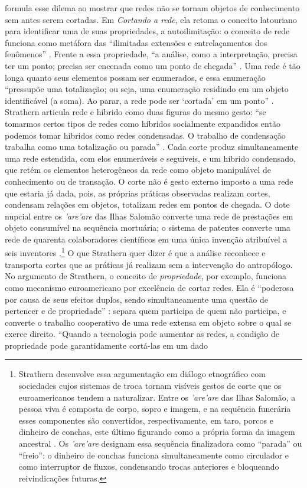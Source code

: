 \textcite{strathern2011cortando} formula esse dilema ao mostrar que redes não se tornam objetos de conhecimento sem antes serem cortadas. Em \textit{Cortando a rede}, ela retoma o conceito latouriano para identificar uma de suas propriedades, a autoilimitação: o conceito de rede funciona como metáfora das ``ilimitadas extensões e entrelaçamentos dos fenômenos'' \parencite[p.~7]{strathern2011cortando}. Frente a essa propriedade, ``a análise, como a interpretação, precisa ter um ponto; precisa ser encenada como um ponto de chegada'' \parencite[p.~7]{strathern2011cortando}. Uma rede é tão longa quanto seus elementos possam ser enumerados, e essa enumeração ``pressupõe uma totalização; ou seja, uma enumeração residindo em um objeto identificável (a soma). Ao parar, a rede pode ser `cortada' em um ponto'' \parencite[p.~7]{strathern2011cortando}. Strathern articula rede e híbrido como duas figuras do mesmo gesto: ``se tomarmos certos tipos de redes como híbridos socialmente expandidos então podemos tomar híbridos como redes condensadas. O trabalho de condensação trabalha como uma totalização ou parada'' \parencite[pp.~7--8]{strathern2011cortando}. Cada corte produz simultaneamente uma rede estendida, com elos enumeráveis e seguíveis, e um híbrido condensado, que retém os elementos heterogêneos da rede como objeto manipulável de conhecimento ou de transação. O corte não é gesto externo imposto a uma rede que estaria já dada, pois, as próprias práticas observadas realizam cortes, condensam relações em objetos, totalizam redes em pontos de chegada. O dote nupcial entre os \textit{'are'are} das Ilhas Salomão converte uma rede de prestações em objeto consumível na sequência mortuária; o sistema de patentes converte uma rede de quarenta colaboradores científicos em uma única invenção atribuível a seis inventores \parencite[pp.~8--9]{strathern2011cortando}.\footnote{Strathern desenvolve essa argumentação em diálogo etnográfico com sociedades cujos sistemas de troca tornam visíveis gestos de corte que os euroamericanos tendem a naturalizar. Entre os \textit{'are'are} das Ilhas Salomão, a pessoa viva é composta de corpo, sopro e imagem, e na sequência funerária esses componentes são convertidos, respectivamente, em taro, porcos e dinheiro de conchas, este último figurando como a própria forma da imagem ancestral \parencite[pp.~10--12]{strathern2011cortando}. Os \textit{'are'are} designam essa sequência finalizadora como ``parada'' ou ``freio'': o dinheiro de conchas funciona simultaneamente como circulador e como interruptor de fluxos, condensando trocas anteriores e bloqueando reivindicações futuras.} O que Strathern quer dizer é que a análise reconhece e transporta cortes que as práticas já realizam sem a intervenção do antropólogo. No argumento de Strathern, o conceito de \textit{propriedade}, por exemplo, funciona como mecanismo euroamericano por excelência de cortar redes. Ela é ``poderosa por causa de seus efeitos duplos, sendo simultaneamente uma questão de pertencer e de propriedade'' \parencite[p.~16]{strathern2011cortando}: separa quem participa de quem não participa, e converte o trabalho cooperativo de uma rede extensa em objeto sobre o qual se exerce direito. ``Quando a tecnologia pode aumentar as redes, a condição de propriedade pode garantidamente cortá-las em um dado 